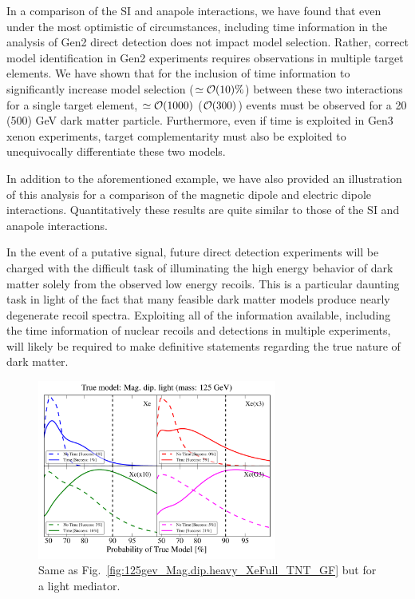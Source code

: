 \documentclass[11pt]{article}
\newcommand{\Fig}[1]{Fig.~\ref{#1}} \newcommand{\Figs}[2]{Figs.~\ref{#1} and \ref{#2}}
\begin{document}
In a comparison of the SI and anapole interactions, we have found that even under the most optimistic of circumstances, including time information in the analysis of Gen2 direct detection does not impact model selection. Rather, correct model identification in Gen2 experiments requires observations in multiple target elements. We have shown that for the inclusion of time information to significantly increase model selection ($\simeq {\cal O}(10)\%$) between these two interactions for a single target element, $\simeq {\cal O}(1000)$ (${\cal O}(300)$) events must be observed for a 20 (500) GeV dark matter particle. Furthermore, even if time is exploited in Gen3 xenon experiments, target complementarity must also be exploited to unequivocally differentiate these two models.

In addition to the aforementioned example, we have also provided an illustration of this analysis for a comparison of the magnetic dipole and electric dipole interactions. Quantitatively these results are quite similar to those of the SI and anapole interactions.

In the event of a putative signal, future direct detection experiments will be charged with the difficult task of illuminating the high energy behavior of dark matter solely from the observed low energy recoils. This is a particular daunting task in light of the fact that many feasible dark matter models produce nearly degenerate recoil spectra. Exploiting all of the information available, including the time information of nuclear recoils and detections in multiple experiments, will likely be required to make definitive statements regarding the true nature of dark matter.

\begin{figure}
\centering
\includegraphics[width=0.7\textwidth]{plots/PDF_125GeV_Magdiplight_50sims_Xe_Xe3x_Xe10x_XeG3_GF_TNT.pdf}
\caption{\label{fig:125gev_Mag.dip.light_XeFull_TNT_GF}
Same as \Fig{fig:125gev_Mag.dip.heavy_XeFull_TNT_GF} but for a light mediator. }
\end{figure}
\end{document}
